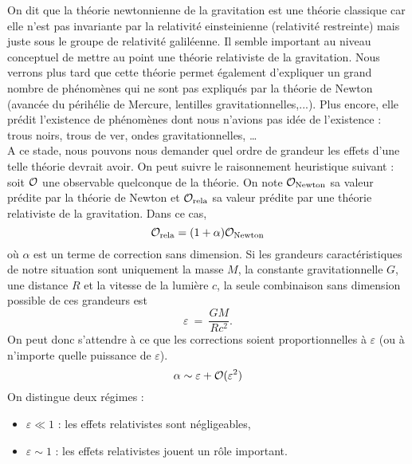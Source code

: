         On dit que la théorie newtonnienne de la gravitation est une théorie classique car elle n'est pas invariante par la relativité einsteinienne (relativité restreinte) mais juste sous le groupe de relativité galiléenne. Il semble important au niveau conceptuel de mettre au point une théorie relativiste de la gravitation. Nous verrons plus tard que cette théorie permet également d'expliquer un grand nombre de phénomènes qui ne sont pas expliqués par la théorie de Newton (avancée du périhélie de Mercure, lentilles gravitationnelles,...). Plus encore, elle prédit l'existence de phénomènes dont nous n'avions pas idée de l'existence : trous noirs, trous de ver, ondes gravitationnelles, \dots\\
        
        A ce stade, nous pouvons nous demander quel ordre de grandeur les effets d'une telle théorie devrait avoir. On peut suivre le raisonnement heuristique suivant : soit $\mathcal{O}$ une observable quelconque de la théorie. On note $\mathcal{O}_{\text{Newton}}$ sa valeur prédite par la théorie de Newton et $\mathcal{O}_{\text{rela}}$ sa valeur prédite par une théorie relativiste de la gravitation. Dans ce cas,
        \begin{equation}
            \mathcal{O}_{\text{rela}} = (1+\alpha)\mathcal{O}_{\text{Newton}}
        \end{equation}
        où $\alpha$ est un terme de correction sans dimension. Si les grandeurs caractéristiques de notre situation sont uniquement la masse $M$, la constante gravitationnelle $G$, une distance $R$ et la vitesse de la lumière $c$, la seule combinaison sans dimension possible de ces grandeurs est 
        \begin{equation}
            \varepsilon~\hat{=}~\frac{GM}{Rc^2}.
        \end{equation}
        On peut donc s'attendre à ce que les corrections soient proportionnelles à $\varepsilon$ (ou à n'importe quelle puissance de $\varepsilon$).
        \begin{equation}
            \alpha\sim\varepsilon+\mathcal{O}(\varepsilon^2)
        \end{equation}
        On distingue deux régimes :
        \begin{itemize}[label=\textbullet]
            \item $\varepsilon\ll 1$ : les effets relativistes sont négligeables,
            \item $\varepsilon\sim 1$ : les effets relativistes jouent un rôle important.
        \end{itemize}
